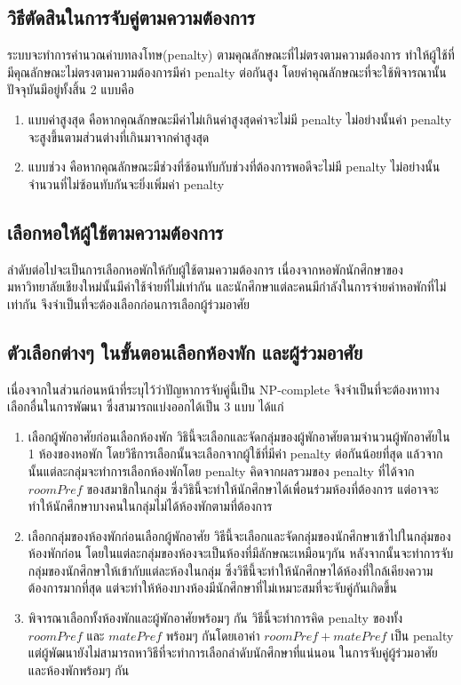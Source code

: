 \subsection{วิธีตัดสินในการจับคู่ตามความต้องการ}
ระบบจะทำการคำนวณค่าบทลงโทษ(penalty) ตามคุณลักษณะที่ไม่ตรงตามความต้องการ ทำให้ผู้ใช้ที่มีคุณลักษณะไม่ตรงตามความต้องการมีค่า penalty ต่อกันสูง
โดยค่าคุณลักษณะที่จะใช้พิจารณานั้นปัจจุบันมีอยู่ทั้งสิ้น 2 แบบคือ
\begin{enumerate}
  \item แบบค่าสูงสุด คือหากคุณลักษณะมีค่าไม่เกินค่าสูงสุดค่าจะไม่มี penalty ไม่อย่างนั้นค่า penalty จะสูงขึ้นตามส่วนต่างที่เกินมาจากค่าสูงสุด
  \item แบบช่วง คือหากคุณลักษณะมีช่วงที่ซ้อนทับกับช่วงที่ต้องการพอดีจะไม่มี penalty ไม่อย่างนั้นจำนวนที่ไม่ซ้อนทับกันจะยิ่งเพิ่มค่า penalty
\end{enumerate}

\subsection{เลือกหอให้ผู้ใช้ตามความต้องการ}
ลำดับต่อไปจะเป็นการเลือกหอพักให้กับผู้ใช้ตามความต้องการ เนื่องจากหอพักนักศึกษาของมหาวิทยาลัยเชียงใหม่นั้นมีค่าใช้จ่ายที่ไม่เท่ากัน
และนักศึกษาแต่ละคนมีกำลังในการจ่ายค่าหอพักที่ไม่เท่ากัน จึงจำเป็นที่จะต้องเลือกก่อนการเลือกผู้ร่วมอาศัย 

\subsection{ตัวเลือกต่างๆ ในขั้นตอนเลือกห้องพัก และผู้ร่วมอาศัย}
เนื่องจากในส่วนก่อนหน้าที่ระบุไว้ว่าปัญหาการจับคู่นี้เป็น NP-complete จึงจำเป็นที่จะต้องหาทางเลือกอื่นในการพัฒนา 
ซึ่งสามารถแบ่งออกได้เป็น 3 แบบ ได้แก่
\begin{enumerate}
  \item เลือกผู้พักอาศัยก่อนเลือกห้องพัก
        วิธินี้จะเลือกและจัดกลุ่มของผู้พักอาศัยตามจำนวนผู้พักอาศัยใน 1 ห้องของหอพัก โดยวิธีการเลือกนั้นจะเลือกจากผู้ใช้ที่มีค่า penalty ต่อกันน้อยที่สุด
        แล้วจากนั้นแต่ละกลุ่มจะทำการเลือกห้องพักโดย penalty คิดจากผลรวมของ penalty ที่ได้จาก $\mathit{roomPref}$ ของสมาชิกในกลุ่ม
        ซึ่งวิธินี้จะทำให้นักศึกษาได้เพื่อนร่วมห้องที่ต้องการ แต่อาจจะทำให้นักศึกษาบางคนในกลุ่มไม่ได้ห้องพักตามที่ต้องการ
  \item เลือกกลุ่มของห้องพักก่อนเลือกผู้พักอาศัย
        วิธีนี้จะเลือกและจัดกลุ่มของนักศึกษาเข้าไปในกลุ่มของห้องพักก่อน โดยในแต่ละกลุ่มของห้องจะเป็นห้องที่มีลักษณะเหมือนๆกัน
        หลังจากนั้นจะทำการจับกลุ่มของนักศึกษาให้เข้ากับแต่ละห้องในกลุ่ม ซึ่งวิธีนี้จะทำให้นักศึกษาได้ห้องที่ใกล้เคียงความต้องการมากที่สุด 
        แต่จะทำให้ห้องบางห้องมีนักศึกษาที่ไม่เหมาะสมที่จะจับคู่กันเกิดขึ้น
  \item พิจารณาเลือกทั้งห้องพักและผู้พักอาศัยพร้อมๆ กัน
        วิธีนี้จะทำการคิด penalty ของทั้ง $\mathit{roomPref}$ และ $\mathit{matePref}$ พร้อมๆ กันโดยเอาค่า $\mathit{roomPref} + \mathit{matePref}$ เป็น penalty
        แต่ผู้พัฒนายังไม่สามารถหาวิธีที่จะทำการเลือกลำดับนักศึกษาที่แน่นอน ในการจับคู่ผู้ร่วมอาศัยและห้องพักพร้อมๆ กัน
\end{enumerate}

